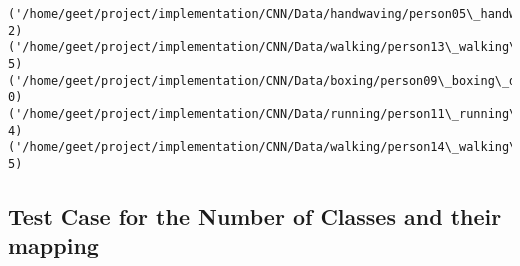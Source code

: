\documentclass[11pt]{article}
\begin{document}
    \begin{Verbatim}[commandchars=\\\{\}]
('/home/geet/project/implementation/CNN/Data/handwaving/person05\_handwaving\_d4\_uncomp.avi', 2)
('/home/geet/project/implementation/CNN/Data/walking/person13\_walking\_d3\_uncomp.avi', 5)
('/home/geet/project/implementation/CNN/Data/boxing/person09\_boxing\_d4\_uncomp.avi', 0)
('/home/geet/project/implementation/CNN/Data/running/person11\_running\_d4\_uncomp.avi', 4)
('/home/geet/project/implementation/CNN/Data/walking/person14\_walking\_d1\_uncomp.avi', 5)

    \end{Verbatim}

    \hypertarget{test-case-for-the-number-of-classes-and-their-mapping}{%
\subsection{Test Case for the Number of Classes and their
mapping}\label{test-case-for-the-number-of-classes-and-their-mapping}}
\end{document}
